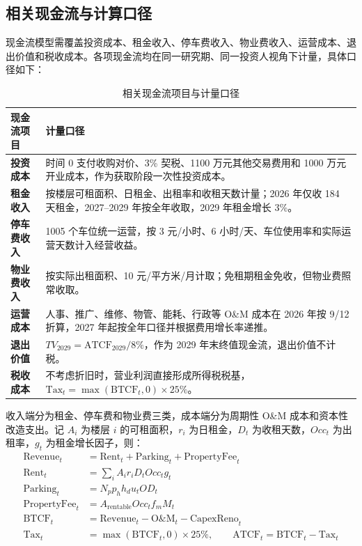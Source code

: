 \documentclass[11pt,a4paper]{ctexart}
\begin{document}
\subsection{相关现金流与计算口径}

现金流模型需覆盖投资成本、租金收入、停车费收入、物业费收入、运营成本、退出价值和税收成本。各项现金流均在同一研究期、同一投资人视角下计量，具体口径如下：

\begin{table}[H]
  \centering
  \caption{相关现金流项目与计量口径}
  \footnotesize
  \begin{tabularx}{\textwidth}{>{\bfseries}p{2.45cm} X}
    \toprule
    现金流项目 & 计量口径 \\
    \midrule
    投资成本 & 时间 0 支付收购对价、3\% 契税、1100 万元其他交易费用和 1000 万元开业成本，作为获取阶段一次性投资成本。 \\
    租金收入 & 按楼层可租面积、日租金、出租率和收租天数计量；2026 年仅收 184 天租金，2027--2029 年按全年收取，2029 年租金增长 3\%。 \\
    停车费收入 & 1005 个车位统一运营，按 3 元/小时、6 小时/天、车位使用率和实际运营天数计入经营收益。 \\
    物业费收入 & 按实际出租面积、10 元/平方米/月计取；免租期租金免收，但物业费照常收取。 \\
    运营成本 & 人事、推广、维修、物管、能耗、行政等 O\&M 成本在 2026 年按 9/12 折算，2027 年起按全年口径并根据费用增长率递推。 \\
    退出价值 & \(TV_{2029}=\text{ATCF}_{2029}/8\%\)，作为 2029 年末终值现金流，退出价值不计税。 \\
    税收成本 & 不考虑折旧时，营业利润直接形成所得税税基，\(\text{Tax}_t=\max(\text{BTCF}_t,0)\times25\%\)。 \\
    \bottomrule
  \end{tabularx}
\end{table}

收入端分为租金、停车费和物业费三类，成本端分为周期性 O\&M 成本和资本性改造支出。记 \(A_i\) 为楼层 \(i\) 的可租面积，\(r_i\) 为日租金，\(D_t\) 为收租天数，\(Occ_t\) 为出租率，\(g_t\) 为租金增长因子，则：
\vspace{-4pt}
\begin{align*}
\text{Revenue}_t &= \text{Rent}_t+\text{Parking}_t+\text{PropertyFee}_t \\
\text{Rent}_t &= \sum_i A_i r_i D_t Occ_t g_t \\
\text{Parking}_t &= N_p p_h h_d u_t OD_t \\
\text{PropertyFee}_t &= A_{\text{rentable}} Occ_t f_m M_t \\
\text{BTCF}_t &= \text{Revenue}_t-\text{O\&M}_t-\text{CapexReno}_t \\
\text{Tax}_t &= \max(\text{BTCF}_t,0)\times25\%, \qquad
\text{ATCF}_t=\text{BTCF}_t-\text{Tax}_t
\end{align*}
\vspace{-8pt}
\end{document}
